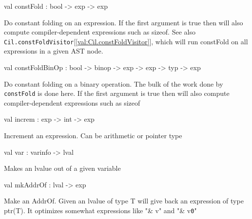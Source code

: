 \documentclass[11pt]{article}
\begin{document}
\label{val:Cil.constFold}\begin{ocamldoccode}
val constFold : bool -> exp -> exp
\end{ocamldoccode}
\begin{ocamldocdescription}
Do constant folding on an expression. If the first argument is true then 
    will also compute compiler-dependent expressions such as sizeof.
    See also {\tt{Cil.constFoldVisitor}}[\ref{val:Cil.constFoldVisitor}], which will run constFold on all
    expressions in a given AST node.


\end{ocamldocdescription}




\label{val:Cil.constFoldBinOp}\begin{ocamldoccode}
val constFoldBinOp : bool -> binop -> exp -> exp -> typ -> exp
\end{ocamldoccode}
\begin{ocamldocdescription}
Do constant folding on a binary operation. The bulk of the work done by 
    {\tt{constFold}} is done here. If the first argument is true then 
    will also compute compiler-dependent expressions such as sizeof


\end{ocamldocdescription}




\label{val:Cil.increm}\begin{ocamldoccode}
val increm : exp -> int -> exp
\end{ocamldoccode}
\begin{ocamldocdescription}
Increment an expression. Can be arithmetic or pointer type


\end{ocamldocdescription}




\label{val:Cil.var}\begin{ocamldoccode}
val var : varinfo -> lval
\end{ocamldoccode}
\begin{ocamldocdescription}
Makes an lvalue out of a given variable


\end{ocamldocdescription}




\label{val:Cil.mkAddrOf}\begin{ocamldoccode}
val mkAddrOf : lval -> exp
\end{ocamldoccode}
\begin{ocamldocdescription}
Make an AddrOf. Given an lvalue of type T will give back an expression of 
    type ptr(T). It optimizes somewhat expressions like "\& v" and "\& v{\tt{0}}"


\end{ocamldocdescription}
\end{document}
